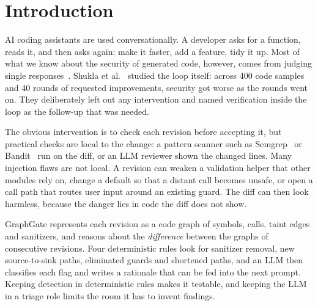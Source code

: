 \documentclass[conference]{IEEEtran}
\begin{document}
\section{Introduction}
\label{sec:intro}

AI coding assistants are used conversationally. A developer asks for a function, reads it, and then asks again: make it faster, add a feature, tidy it up. Most of what we know about the security of generated code, however, comes from judging single responses~\cite{pearce2022asleep,perry2023insecure}. Shukla et al.~\cite{shukla2025degradation} studied the loop itself: across 400 code samples and 40 rounds of requested improvements, security got worse as the rounds went on. They deliberately left out any intervention and named verification inside the loop as the follow-up that was needed.

The obvious intervention is to check each revision before accepting it, but practical checks are local to the change: a pattern scanner such as Semgrep~\cite{semgrep} or Bandit~\cite{bandit} run on the diff, or an LLM reviewer shown the changed lines. Many injection flaws are not local. A revision can weaken a validation helper that other modules rely on, change a default so that a distant call becomes unsafe, or open a call path that routes user input around an existing guard. The diff can then look harmless, because the danger lies in code the diff does not show.

GraphGate represents each revision as a code graph of symbols, calls, taint edges and sanitizers, and reasons about the \emph{difference} between the graphs of consecutive revisions. Four deterministic rules look for sanitizer removal, new source-to-sink paths, eliminated guards and shortened paths, and an LLM then classifies each flag and writes a rationale that can be fed into the next prompt. Keeping detection in deterministic rules makes it testable, and keeping the LLM in a triage role limits the room it has to invent findings.
\end{document}
